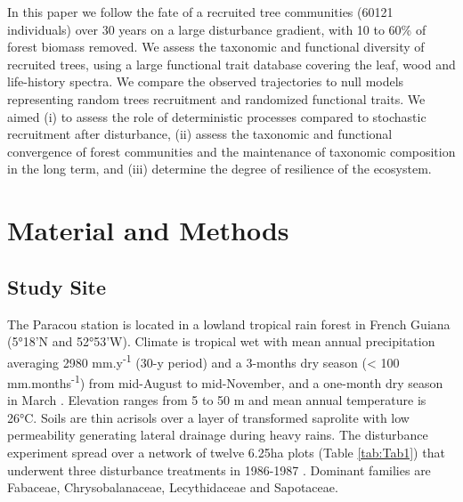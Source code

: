 \documentclass[fleqn,10pt]{ArtEcoFoG} %
\begin{document}
In this paper we follow the fate of a recruited tree communities (60121
individuals) over 30 years on a large disturbance gradient, with 10 to
60\% of forest biomass removed. We assess the taxonomic and functional
diversity of recruited trees, using a large functional trait database
covering the leaf, wood and life-history spectra. We compare the
observed trajectories to null models representing random trees
recruitment and randomized functional traits. We aimed (i) to assess the
role of deterministic processes compared to stochastic recruitment after
disturbance, (ii) assess the taxonomic and functional convergence of
forest communities and the maintenance of taxonomic composition in the
long term, and (iii) determine the degree of resilience of the
ecosystem.

\section{Material and Methods}\label{material-and-methods}

\subsection{Study Site}\label{study-site}

The Paracou station is located in a lowland tropical rain forest in
French Guiana (5°18'N and 52°53'W). Climate is tropical wet with mean
annual precipitation averaging 2980 mm.y\textsuperscript{-1} (30-y
period) and a 3-months dry season (\textless{} 100
mm.months\textsuperscript{-1}) from mid-August to mid-November, and a
one-month dry season in March \citep{Wagner2011}. Elevation ranges from
5 to 50 m and mean annual temperature is 26°C. Soils are thin acrisols
over a layer of transformed saprolite with low permeability generating
lateral drainage during heavy rains. The disturbance experiment spread
over a network of twelve 6.25ha plots (Table \ref{tab:Tab1}) that
underwent three disturbance treatments in 1986-1987 \citep{Herault2018}.
Dominant families are Fabaceae, Chrysobalanaceae, Lecythidaceae and
Sapotaceae.
\end{document}

